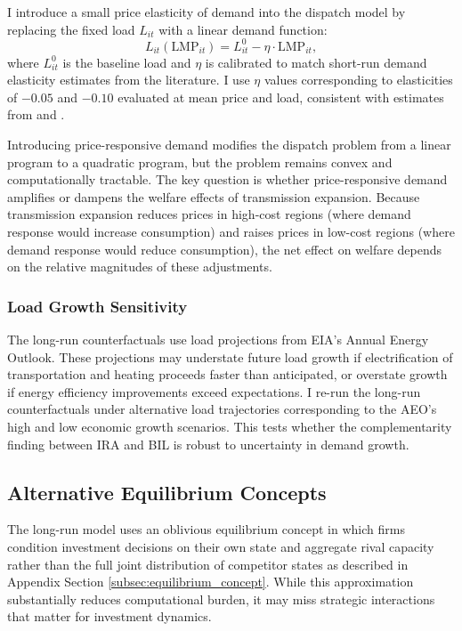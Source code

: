 \documentclass[12pt]{article}
\begin{document}
I introduce a small price elasticity of demand into the dispatch model by replacing the fixed load $L_{it}$ with a linear demand function:
\begin{equation}
    L_{it}(\text{LMP}_{it}) = L_{it}^0 - \eta \cdot \text{LMP}_{it},
\end{equation}
where $L_{it}^0$ is the baseline load and $\eta$ is calibrated to match short-run demand elasticity estimates from the literature. I use $\eta$ values corresponding to elasticities of $-0.05$ and $-0.10$ evaluated at mean price and load, consistent with estimates from \cite{ito2016sequential} and \cite{jessoe2014knowledge}.

Introducing price-responsive demand modifies the dispatch problem from a linear program to a quadratic program, but the problem remains convex and computationally tractable. The key question is whether price-responsive demand amplifies or dampens the welfare effects of transmission expansion. Because transmission expansion reduces prices in high-cost regions (where demand response would increase consumption) and raises prices in low-cost regions (where demand response would reduce consumption), the net effect on welfare depends on the relative magnitudes of these adjustments.

\subsubsection{Load Growth Sensitivity}

The long-run counterfactuals use load projections from EIA's Annual Energy Outlook. These projections may understate future load growth if electrification of transportation and heating proceeds faster than anticipated, or overstate growth if energy efficiency improvements exceed expectations. I re-run the long-run counterfactuals under alternative load trajectories corresponding to the AEO's high and low economic growth scenarios. This tests whether the complementarity finding between IRA and BIL is robust to uncertainty in demand growth.


\subsection{Alternative Equilibrium Concepts}\label{app:robustness:equilibrium}

The long-run model uses an oblivious equilibrium concept in which firms condition investment decisions on their own state and aggregate rival capacity rather than the full joint distribution of competitor states as described in Appendix Section \ref{subsec:equilibrium_concept}. While this approximation substantially reduces computational burden, it may miss strategic interactions that matter for investment dynamics.
\end{document}
